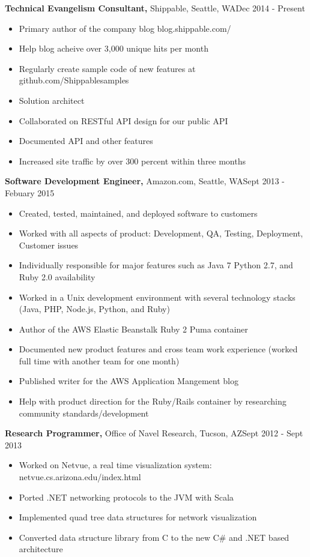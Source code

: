 \documentclass{res}
\begin{document}
\begin{resume}
  {\bf Technical Evangelism Consultant,} Shippable, Seattle, WA\hfill Dec 2014 - Present
  \begin{itemize} \itemsep -2pt  %
    \item Primary author of the company blog blog.shippable.com/
    \item Help blog acheive over 3,000 unique hits per month
    \item Regularly create sample code of new features at github.com/Shippablesamples
    \item Solution architect
    \item Collaborated on RESTful API design for our public API
    \item Documented API and other features
    \item Increased site traffic by over 300 percent within three months
  \end{itemize}

  {\bf Software Development Engineer,} Amazon.com, Seattle, WA\hfill Sept 2013 - Febuary 2015
  \begin{itemize} \itemsep -2pt  %
    \item Created, tested, maintained, and deployed software to customers
    \item Worked with all aspects of product: Development, QA, Testing, Deployment, Customer issues
    \item Individually responsible for major features such as Java 7 Python 2.7, and Ruby 2.0 availability
    \item Worked in a Unix development environment with several technology stacks (Java, PHP, Node.js, Python, and Ruby)
    \item Author of the AWS Elastic Beanstalk Ruby 2 Puma container
    \item Documented new product features and cross team work experience (worked full time with another team for one month)
    \item Published writer for the AWS Application Mangement blog
    \item Help with product direction for the Ruby/Rails container by researching community standards/development
  \end{itemize}

  {\bf Research Programmer,} Office of Navel Research, Tucson, AZ\hfill Sept 2012 - Sept 2013
  \begin{itemize} \itemsep -2pt %
    \item Worked on Netvue, a real time visualization system: netvue.cs.arizona.edu/index.html
    \item Ported .NET networking protocols to the JVM with Scala
    \item Implemented quad tree data structures for network visualization
    \item Converted data structure library from C to the new C\# and .NET based architecture
  \end{itemize}


\end{resume}
\end{document}

